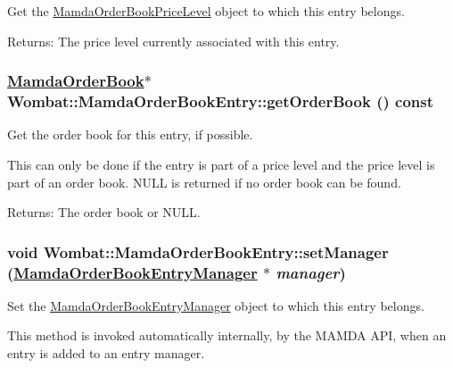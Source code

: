 Get the \hyperlink{classWombat_1_1MamdaOrderBookPriceLevel}{Mamda\-Order\-Book\-Price\-Level} object to which this entry belongs. 

\begin{Desc}
\item[Returns:]The price level currently associated with this entry. \end{Desc}
\hypertarget{classWombat_1_1MamdaOrderBookEntry_253ddeced9d61df56ddbc7b68cfdabf4}{
\subsubsection[getOrderBook]{\setlength{\rightskip}{0pt plus 5cm}\hyperlink{classWombat_1_1MamdaOrderBook}{Mamda\-Order\-Book}$\ast$ Wombat::Mamda\-Order\-Book\-Entry::get\-Order\-Book () const}}
\label{classWombat_1_1MamdaOrderBookEntry_253ddeced9d61df56ddbc7b68cfdabf4}


Get the order book for this entry, if possible. 

This can only be done if the entry is part of a price level and the price level is part of an order book. NULL is returned if no order book can be found.

\begin{Desc}
\item[Returns:]The order book or NULL. \end{Desc}
\hypertarget{classWombat_1_1MamdaOrderBookEntry_7892c5a0b18aaae44b0a33d5696881a3}{
\subsubsection[setManager]{\setlength{\rightskip}{0pt plus 5cm}void Wombat::Mamda\-Order\-Book\-Entry::set\-Manager (\hyperlink{classWombat_1_1MamdaOrderBookEntryManager}{Mamda\-Order\-Book\-Entry\-Manager} $\ast$ {\em manager})}}
\label{classWombat_1_1MamdaOrderBookEntry_7892c5a0b18aaae44b0a33d5696881a3}


Set the \hyperlink{classWombat_1_1MamdaOrderBookEntryManager}{Mamda\-Order\-Book\-Entry\-Manager} object to which this entry belongs. 

This method is invoked automatically internally, by the MAMDA API, when an entry is added to an entry manager.

